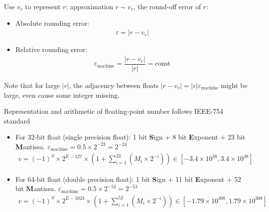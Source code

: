     


    Use $ v_r $ to represent $ r $: approximation $ r\sim v_r $, the round-off error of $ r $:
\begin{itemize}[topsep=2pt,itemsep=0pt]
    \item Absolute rounding error: 
    \begin{align}
         \varepsilon =|r-v_r|
    \end{align}
    \item Relative rounding error:
    \begin{align}
        \varepsilon _\mathrm{machine}=\dfrac{|r-v_r|}{|r|}  =\mathrm{const}
    \end{align}
\end{itemize}
    Note that for large $ |r| $, the adjacency between floats $ |r-v_r|=|r|\varepsilon _\mathrm{machine}  $ might be large, even cause some integer missing.   

\begin{point}
    Representation and arithmetic of floating-point number follows IEEE-754 standard
\end{point}
    

\begin{itemize}[topsep=2pt,itemsep=0pt]
    \item For 32-bit float (single precision float): 1 bit \textbf{S}ign + 8 bit \textbf{E}xponent + 23 bit \textbf{M}antissa. $ \varepsilon _\mathrm{machine}= 0.5\times 2^{-23}=2^{-24}  $
    \begin{align}
        v=(-1)^S\times 2^{E-127}\times \left(1+\sum_{i=1}^{23}(M_i\times 2^{-i})\right)\in [-3.4\times 10^{38},3.4\times 10^{38}]
    \end{align}



    \item For 64-bit float (double precision float): 1 bit \textbf{S}ign + 11 bit \textbf{E}xponent + 52 bit \textbf{M}antissa.   $ \varepsilon _\mathrm{machine}= 0.5\times 2^{-52}=2^{-53}  $
    \begin{align}
        v=(-1)^S\times 2^{E-1023}\times \left(1+\sum_{i=1}^{52}(M_i\times 2^{-i})\right)\in [ -1.79\times 10^{308}, 1.79\times 10^{308}]
    \end{align}
    
\end{itemize}   
    
    
    
    
        


